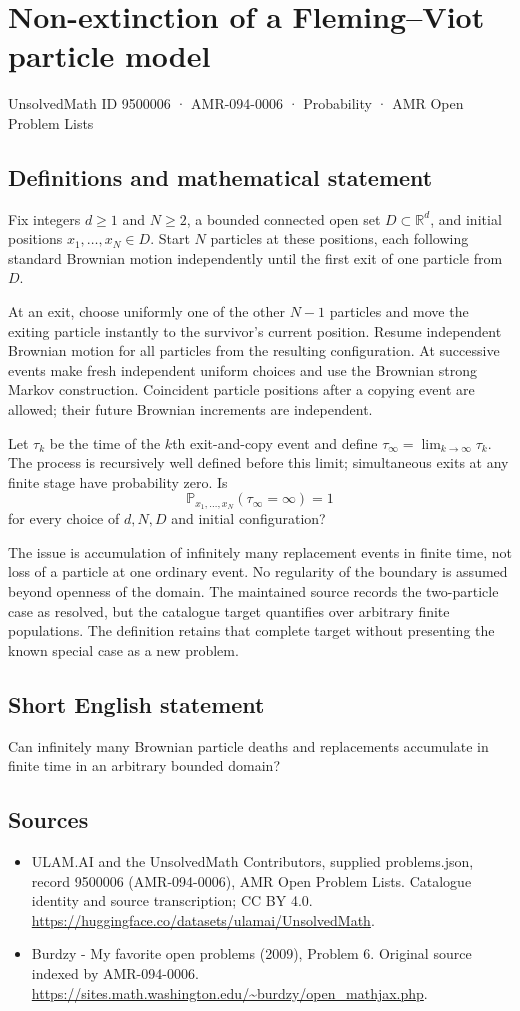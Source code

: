 \documentclass[11pt,a4paper]{article}
\begin{document}
\section*{Non-extinction of a Fleming–Viot particle model}\label{9500006}
{\small UnsolvedMath ID 9500006 · AMR-094-0006 · Probability · AMR Open Problem Lists}
\subsection{Definitions and mathematical statement}
Fix integers $d\ge1$ and $N\ge2$, a bounded connected open set $D\subset\mathbb R^d$, and initial positions $x_1,\ldots,x_N\in D$. Start $N$ particles at these positions, each following standard Brownian motion independently until the first exit of one particle from $D$.

At an exit, choose uniformly one of the other $N-1$ particles and move the exiting particle instantly to the survivor's current position. Resume independent Brownian motion for all particles from the resulting configuration. At successive events make fresh independent uniform choices and use the Brownian strong Markov construction. Coincident particle positions after a copying event are allowed; their future Brownian increments are independent.

Let $\tau_k$ be the time of the $k$th exit-and-copy event and define $\tau_\infty=\lim_{k\to\infty}\tau_k$. The process is recursively well defined before this limit; simultaneous exits at any finite stage have probability zero. Is
\[
\mathbb P_{x_1,\ldots,x_N}(\tau_\infty=\infty)=1
\]
for every choice of $d,N,D$ and initial configuration?

The issue is accumulation of infinitely many replacement events in finite time, not loss of a particle at one ordinary event. No regularity of the boundary is assumed beyond openness of the domain. The maintained source records the two-particle case as resolved, but the catalogue target quantifies over arbitrary finite populations. The definition retains that complete target without presenting the known special case as a new problem.
\subsection{Short English statement}
Can infinitely many Brownian particle deaths and replacements accumulate in finite time in an arbitrary bounded domain?
\subsection{Sources}
\begin{itemize}
\item[S1] ULAM.AI and the UnsolvedMath Contributors, supplied problems.json, record 9500006 (AMR-094-0006), AMR Open Problem Lists. Catalogue identity and source transcription; CC BY 4.0.
\url{https://huggingface.co/datasets/ulamai/UnsolvedMath}.
\item[S2] Burdzy - My favorite open problems (2009), Problem 6. Original source indexed by AMR-094-0006.
\url{https://sites.math.washington.edu/~burdzy/open_mathjax.php}.
\end{itemize}
\end{document}
